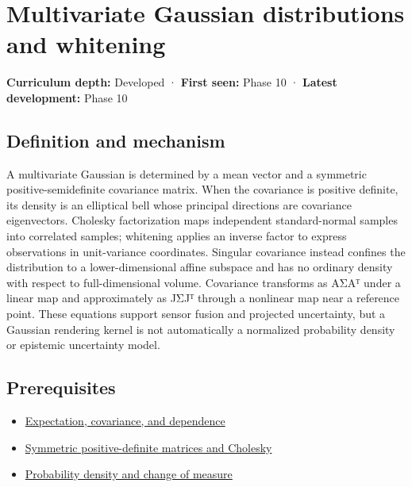 \hypertarget{appendix-12bbe185dbe5}{}\label{referencestart:appendix-12bbe185dbe5}
\section{Multivariate Gaussian distributions and whitening}\label{appendix-12bbe185dbe5-multivariate-gaussian-distributions-and-whitening}

\textbf{Curriculum depth:} Developed · \textbf{First seen:} Phase 10 · \textbf{Latest development:} Phase 10

\subsection{Definition and mechanism}\label{appendix-12bbe185dbe5-definition-and-mechanism}

A multivariate Gaussian is determined by a mean vector and a symmetric positive-semidefinite covariance matrix. When the covariance is positive definite, its density is an elliptical bell whose principal directions are covariance eigenvectors. Cholesky factorization maps independent standard-normal samples into correlated samples; whitening applies an inverse factor to express observations in unit-variance coordinates. Singular covariance instead confines the distribution to a lower-dimensional affine subspace and has no ordinary density with respect to full-dimensional volume. Covariance transforms as AΣAᵀ under a linear map and approximately as JΣJᵀ through a nonlinear map near a reference point. These equations support sensor fusion and projected uncertainty, but a Gaussian rendering kernel is not automatically a normalized probability density or epistemic uncertainty model.

\subsection{Prerequisites}\label{appendix-12bbe185dbe5-prerequisites}

\begin{itemize}
\tightlist
\item
  \hyperref[appendix-54c383df9992]{Expectation, covariance, and dependence}
\item
  \hyperref[appendix-50d2ea3c9b26]{Symmetric positive-definite matrices and Cholesky}
\item
  \hyperref[appendix-4815cd87ab8b]{Probability density and change of measure}
\end{itemize}

